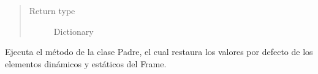 \documentclass[class=report, crop=false]{standalone}
\begin{document}
\begin{fulllineitems}
\begin{fulllineitems}
\begin{quote}
\begin{description}
\item[{Return type}] \leavevmode
Dictionary
\end{description}\end{quote}

\end{fulllineitems}

\begin{fulllineitems}

Ejecuta el método de la clase Padre, el cual restaura los 
valores por defecto de los elementos dinámicos y estáticos 
del Frame.

\end{fulllineitems}

\end{fulllineitems}
\end{document}
